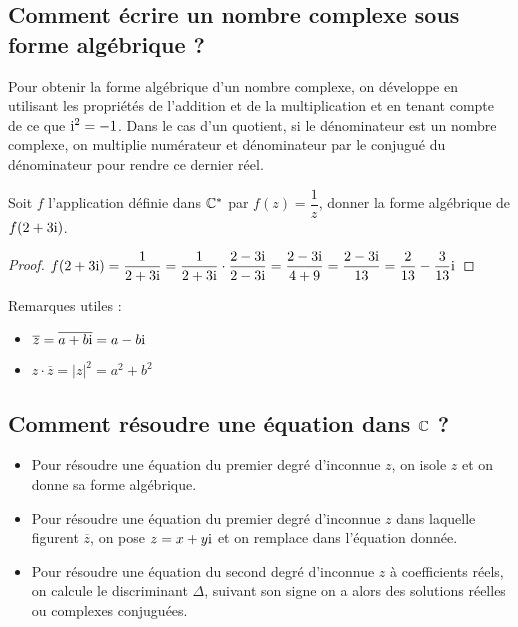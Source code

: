 
 



 \summary{}

\subsection{Comment écrire un nombre complexe sous forme algébrique ?}

\begin{methode}
Pour obtenir la forme algébrique d'un nombre complexe, on développe en utilisant les propriétés de l'addition et de la multiplication et en tenant compte de ce que $\text{i}^2 = -1$. Dans le cas d'un quotient, si le dénominateur est un nombre complexe, on multiplie numérateur et dénominateur par le conjugué du dénominateur pour rendre ce dernier réel.
\end{methode}

\begin{example}
Soit $f$ l'application définie dans $\mathbb{C}^*$ par $f(z) = \dfrac{1}{z}$, donner la forme algébrique de $f(2+3\text{i})$.

\begin{proof}
$f(2+3\text{i}) = \dfrac{1}{2+3\text{i}} = \dfrac{1}{2+3\text{i}} \cdot \dfrac{2-3\text{i}}{2-3\text{i}} = \dfrac{2-3\text{i}}{4+9} = \dfrac{2-3\text{i}}{13} = \dfrac{2}{13} - \dfrac{3}{13}\text{i}$
\end{proof}
\end{example}

\begin{remark}
Remarques utiles :
\begin{itemize}
\item $\overline{z} = \overline{a+b\text{i}} = a-b\text{i}$
\item $z \cdot \overline{z} = |z|^2 = a^2 + b^2$
\end{itemize}
\end{remark}

\subsection{Comment résoudre une équation dans $\mathbb{C}$ ?}

\begin{methode}
\begin{itemize}
\item Pour résoudre une équation du premier degré d'inconnue $z$, on isole $z$ et on donne sa forme algébrique.
\item Pour résoudre une équation du premier degré d'inconnue $z$ dans laquelle figurent $\overline{z}$, on pose $z = x + y\text{i}$ et on remplace dans l'équation donnée.
\item Pour résoudre une équation du second degré d'inconnue $z$ à coefficients réels, on calcule le discriminant $\Delta$, suivant son signe on a alors des solutions réelles ou complexes conjuguées.
\end{itemize}
\end{methode}

